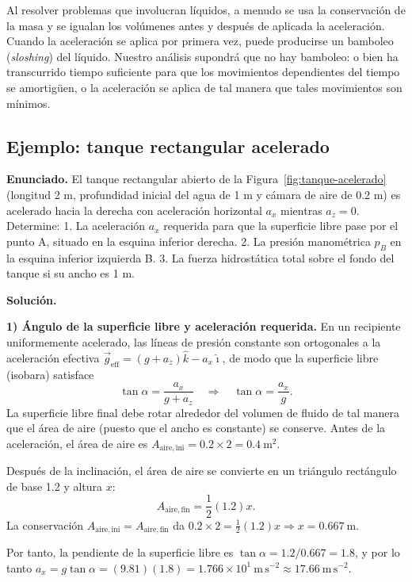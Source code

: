 \figuraAceleracionPlano

Al resolver problemas que involucran líquidos, a menudo se usa la conservación de la masa y se igualan los volúmenes antes y después de aplicada la aceleración. Cuando la aceleración se aplica por primera vez, puede producirse un bamboleo (\emph{sloshing}) del líquido. Nuestro análisis supondrá que no hay bamboleo: o bien ha transcurrido tiempo suficiente para que los movimientos dependientes del tiempo se amortigüen, o la aceleración se aplica de tal manera que tales movimientos son mínimos.

\subsection{Ejemplo: tanque rectangular acelerado}

\figuraTanqueAcelerado

\textbf{Enunciado.} El tanque rectangular abierto de la Figura~\ref{fig:tanque-acelerado} (longitud 2 m, profundidad inicial del agua de 1 m y cámara de aire de 0.2 m) es acelerado hacia la derecha con aceleración horizontal $a_x$ mientras $a_z = 0$. Determine: 1. La aceleración $a_x$ requerida para que la superficie libre pase por el punto A, situado en la esquina inferior derecha. 2. La presión manométrica $p_B$ en la esquina inferior izquierda B. 3. La fuerza hidrostática total sobre el fondo del tanque si su ancho es 1 m.

\textbf{Solución.}

\textbf{1) Ángulo de la superficie libre y aceleración requerida.} En un recipiente uniformemente acelerado, las líneas de presión constante son ortogonales a la aceleración efectiva $\vec{g}_{\mathrm{eff}} = (g + a_z)\hat{k} - a_x\hat{\imath}$, de modo que la superficie libre (isobara) satisface
$$ \tan\alpha = \frac{a_x}{g + a_z} \quad\Rightarrow\quad \tan\alpha = \frac{a_x}{g}. $$
La superficie libre final debe rotar alrededor del volumen de fluido de tal manera que el área de aire (puesto que el ancho es constante) se conserve. Antes de la aceleración, el área de aire es $A_{\mathrm{aire,ini}} = 0.2 \times 2 = 0.4\ \mathrm{m}^2$.

Después de la inclinación, el área de aire se convierte en un triángulo rectángulo de base 1.2 y altura $x$:
$$ A_{\mathrm{aire,fin}} = \frac{1}{2}(1.2)x. $$
La conservación $A_{\mathrm{aire,ini}} = A_{\mathrm{aire,fin}}$ da $0.2 \times 2 = \frac{1}{2}(1.2)x \Rightarrow x = 0.667\ \mathrm{m}$.

Por tanto, la pendiente de la superficie libre es $\tan\alpha = 1.2/0.667 = 1.8$, y por lo tanto $a_x = g\tan\alpha = (9.81)(1.8) = 1.766\times 10^1\ \mathrm{m\,s^{-2}} \approx 17.66\ \mathrm{m\,s^{-2}}$.

